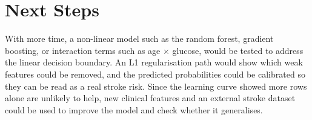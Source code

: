 \section{Next Steps}
With more time, a non-linear model such as the random forest, gradient boosting, or interaction terms such as age $\times$ glucose, would be tested to address the linear decision boundary.
An L1 regularisation path would show which weak features could be removed, and the predicted probabilities could be calibrated so they can be read as a real stroke risk. Since the learning curve showed more rows alone are unlikely to help, new clinical features and an external stroke dataset could be used to improve the model and check whether it generalises.
